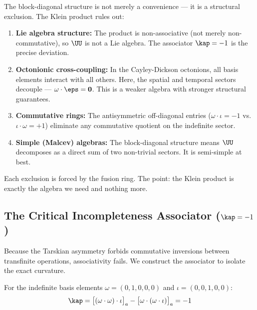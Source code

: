 \begin{remark}\label{rem:exclusion}
The block-diagonal structure is not merely a convenience --- it is a structural exclusion. The Klein product rules out:
\begin{enumerate}
\item \textbf{Lie algebra structure:} The product is non-associative (not merely non-commutative), so $\UU$ is not a Lie algebra. The associator $\kap = -1$ is the precise deviation.
\item \textbf{Octonionic cross-coupling:} In the Cayley-Dickson octonions, all basis elements interact with all others. Here, the spatial and temporal sectors decouple --- $\omega \cdot \eps = \mathbf{0}$. This is a weaker algebra with stronger structural guarantees.
\item \textbf{Commutative rings:} The antisymmetric off-diagonal entries ($\omega \cdot \iota = -1$ vs.\ $\iota \cdot \omega = +1$) eliminate any commutative quotient on the indefinite sector.
\item \textbf{Simple (Malcev) algebras:} The block-diagonal structure means $\UU$ decomposes as a direct sum of two non-trivial sectors. It is semi-simple at best.
\end{enumerate}
Each exclusion is forced by the fusion ring. The point: the Klein product is exactly the algebra we need and nothing more.
\end{remark}

\subsection{The Critical Incompleteness Associator ($\kap = -1$)}\label{sec:curvature}

Because the Tarskian asymmetry forbids commutative inversions between transfinite operations, associativity fails. We construct the associator to isolate the exact curvature.

\begin{theorem}\label{thm:associator}\label{thm:curvature}
For the indefinite basis elements $\omega = (0,1,0,0,0)$ and $\iota = (0,0,1,0,0)$:
$$\kap = \bigl[(\omega \cdot \omega) \cdot \iota\bigr]_a - \bigl[\omega \cdot (\omega \cdot \iota)\bigr]_a = -1$$
\end{theorem}

